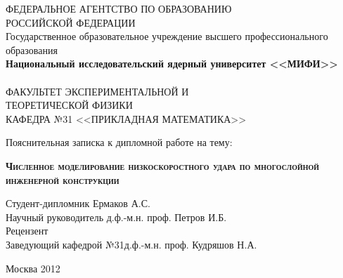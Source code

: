 \begin{titlepage}
\newpage

\begin{center}
ФЕДЕРАЛЬНОЕ АГЕНТСТВО ПО ОБРАЗОВАНИЮ\\РОССИЙСКОЙ ФЕДЕРАЦИИ\\
Государственное образовательное учреждение высшего профессионального образования\\
\textbf{Национальный исследовательский ядерный университет <<МИФИ>>}\\
\hrulefill\\
ФАКУЛЬТЕТ ЭКСПЕРИМЕНТАЛЬНОЙ И\\ТЕОРЕТИЧЕСКОЙ ФИЗИКИ\\
\vspace{1cm}
КАФЕДРА №31 <<ПРИКЛАДНАЯ МАТЕМАТИКА>>\\
\end{center}

\vspace{8em}

\begin{center}
\Large Пояснительная записка к дипломной работе на тему:
\end{center}

\vspace{2.5em}

\begin{center}
\textsc{\textbf{Численное моделирование низкоскоростного удара по многослойной инженерной конструкции}}
\end{center}

\vspace{6em}

\begin{flushleft}
\vspace{1.5em}
Студент-дипломник \hrulefill Ермаков А.С.\\
\vspace{1.5em}
Научный руководитель \hrulefill д.ф.-м.н. проф. Петров И.Б.\\
\vspace{1.5em}
Рецензент \hrulefill \\
\vspace{1.5em}
Заведующий кафедрой №31\hrulefill д.ф.-м.н. проф. Кудряшов Н.А.\\
\end{flushleft}

\vspace{\fill}
\begin{center}
Москва 2012
\end{center}

\end{titlepage}
